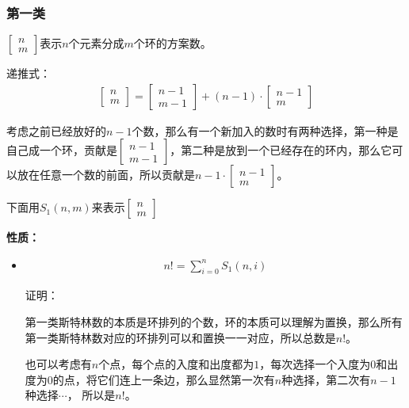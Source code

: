 \subsubsection{第一类}
$\left[
\begin{array}{cccc}
n \\ 
m
\end{array}
\right]$表示$n$个元素分成$m$个环的方案数。\par
递推式：
\begin{eqnarray*}
\left[
\begin{array}{cccc}
n \\ 
m
\end{array}
\right] 
= 
\left[
\begin{array}{cccc}
n - 1 \\
m - 1
\end{array}
\right] 
+ 
(n - 1) \cdot 
\left[
\begin{array}{cccc}
n - 1 \\
m
\end{array}
\right]
\end{eqnarray*} \par
考虑之前已经放好的$n - 1$个数，那么有一个新加入的数时有两种选择，第一种是自己成一个环，贡献是$\left[\begin{array}{cccc} n - 1 \\ m - 1\end{array}\right]$，第二种是放到一个已经存在的环内，那么它可以放在任意一个数的前面，所以贡献是$n - 1 \cdot \left[ \begin{array}{cccc}
n - 1 \\ m
\end{array}\right]$。\par
下面用$S_1(n, m)$来表示$\left[\begin{array}{cccc}n \\ m\end{array}\right]$\par
		
\textbf{性质：}\par
\begin{itemize}
\item 
\begin{eqnarray*}
n! = \sum\limits_{i = 0}^n S_1(n, i)
\end{eqnarray*} \par
证明：\par
第一类斯特林数的本质是环排列的个数，环的本质可以理解为置换，那么所有第一类斯特林数对应的环排列可以和置换一一对应，所以总数是$n!$。\par
也可以考虑有$n$个点，每个点的入度和出度都为$1$，每次选择一个入度为$0$和出度为$0$的点，将它们连上一条边，那么显然第一次有$n$种选择，第二次有$n - 1$种选择$\cdots$，
所以是$n!$。\par
\end{itemize}
		

